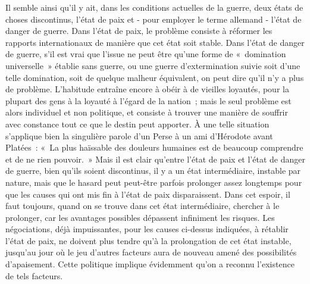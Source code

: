 \documentclass[french,twoside]{book} %
\begin{document}
Il semble ainsi qu'il y ait, dans les conditions actuelles de la guerre, deux états de choses discontinus, l'état de paix et - pour employer le terme allemand - l'état de danger de guerre. Dans l'état de paix, le problème consiste à réformer les rapports internationaux de manière que cet état soit stable. Dans l'état de danger de guerre, s'il est vrai que l'issue ne peut être qu'une forme de « domination universelle » établie sans guerre, ou une guerre d'extermination suivie soit d'une telle domination, soit de quelque malheur équivalent, on peut dire qu'il n'y a plus de problème. L'habitude entraîne encore à obéir à de vieilles loyautés, pour la plupart des gens à la loyauté à l'égard de la nation ; mais le seul problème est alors individuel et non politique, et consiste à trouver une manière de souffrir avec constance tout ce que le destin peut apporter. À une telle situation s'applique bien la singulière parole d'un Perse à un ami d'Hérodote avant Platées : « La plus haïssable des douleurs humaines est de beaucoup comprendre et de ne rien pouvoir. » Mais il est clair qu'entre l'état de paix et l'état de danger de guerre, bien qu'ils soient discontinus, il y a un état intermédiaire, instable par nature, mais que le hasard peut peut-être parfois prolonger assez longtemps pour que les causes qui ont mis fin à l'état de paix disparaissent. Dans cet espoir, il faut toujours, quand on se trouve dans cet état intermédiaire, chercher à le prolonger, car les avantages possibles dépassent infiniment les risques. Les négociations, déjà impuissantes, pour les causes ci-dessus indiquées, à rétablir l'état de paix, ne doivent plus tendre qu'à la prolongation de cet état instable, jusqu'au jour où le jeu d'autres facteurs aura de nouveau amené des possibilités d'apaisement. Cette politique implique évidemment qu'on a reconnu l'existence de tels facteurs.\par
\end{document}
